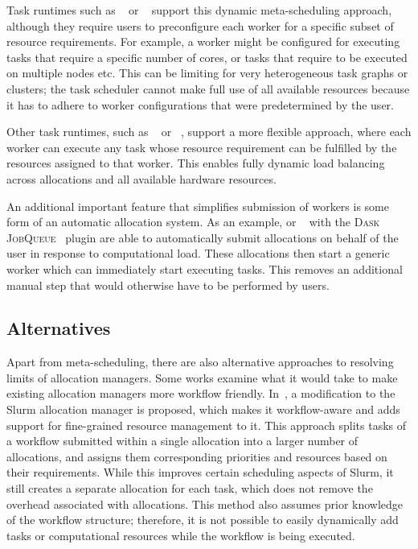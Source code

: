 Task runtimes such as \merlin{}~\cite{merlin} or
\parsl{}~\cite{parsl} support this dynamic meta-scheduling approach,
although they require users to preconfigure each worker for a specific subset of resource
requirements. For example, a worker might be configured for executing tasks that require a specific
number of cores, or tasks that require to be executed on multiple nodes etc. This can be limiting
for very heterogeneous task graphs or clusters; the task scheduler cannot make full use of all
available resources because it has to adhere to worker configurations that were predetermined by
the user.

Other task runtimes, such as \balsam{}~\cite{balsam} or
\fireworks~\cite{fireworks}, support a more flexible approach, where each worker can execute
any task whose resource requirement can be fulfilled by the resources assigned to that worker. This
enables fully dynamic load balancing across allocations and all available hardware resources.

An additional important feature that simplifies submission of workers is some form of an automatic
allocation system. As an example, \balsam{} or
\dask{}~\cite{dask} with the
\textsc{Dask JobQueue}~\cite{dask-jobqueue} plugin are able to automatically submit allocations
on behalf of the user in response to computational load. These allocations then start a generic
worker which can immediately start executing tasks. This removes an additional manual step that
would otherwise have to be performed by users.

\subsection*{Alternatives}
Apart from meta-scheduling, there are also alternative approaches to resolving limits of allocation
managers. Some works examine what it would take to make existing allocation managers more workflow
friendly. In~\cite{slurm-workflow}, a modification to the Slurm allocation manager is proposed,
which makes it workflow-aware and adds support for fine-grained resource management to it. This
approach splits tasks of a workflow submitted within a single allocation into a larger number of
allocations, and assigns them corresponding priorities and resources based on their requirements.
While this improves certain scheduling aspects of Slurm, it still creates a separate allocation for
each task, which does not remove the overhead associated with allocations. This method also assumes
prior knowledge of the workflow structure; therefore, it is not possible to easily dynamically add
tasks or computational resources while the workflow is being executed.

